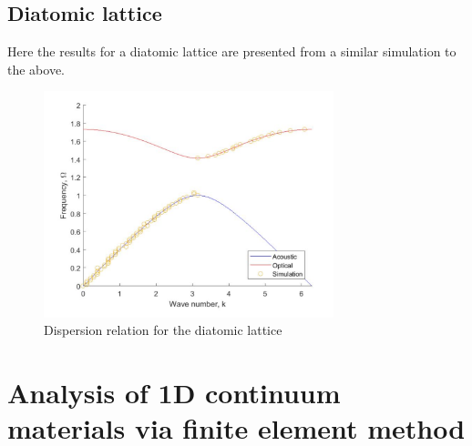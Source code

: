 \documentclass{article}
\begin{document}
\subsection{Diatomic lattice}
Here the results for a diatomic lattice are presented from a similar simulation 
to the above.
\begin{figure}[!htbp]
	\centering
	\includegraphics[width=0.75\textwidth]{diatomic-dr.pdf}
	\caption{Dispersion relation for the diatomic lattice}
	\label{fig:diadr}
\end{figure}

\section{Analysis of 1D continuum materials via finite element method}
\end{document}
